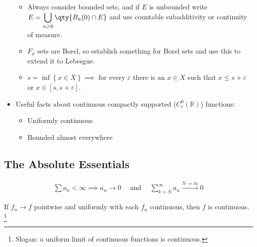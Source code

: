 \begin{itemize}
  \begin{itemize}
  \item
    Always consider bounded sets, and if \(E\) is unbounded write
    \(E = \displaystyle\bigcup_{n\geq 0} \qty{ B_{n}(0) \cap E}\) and
    use countable subadditivity or continuity of measure.
  \item
    \(F_\sigma\) sets are Borel, so establish something for Borel sets
    and use this to extend it to Lebesgue.
  \item
    \(s = \inf\left\{{x\in X}\right\} \implies\) for every
    \(\varepsilon\) there is an \(x\in X\) such that
    \(x \leq s + \varepsilon\) or \(x\in [s, s+{\varepsilon}]\).
  \end{itemize}
\item
  Useful facts about continuous compactly supported
  (\(C_c^0({\mathbb{R}})\)) functions:

  \begin{itemize}
  \tightlist
  \item
    Uniformly continuous
  \item
    Bounded almost everywhere
  \end{itemize}
\end{itemize}

\hypertarget{the-absolute-essentials}{%
\subsection{The Absolute Essentials}\label{the-absolute-essentials}}

\begin{proposition}

\begin{align*}\sum a_n < \infty \implies a_n \to 0 {\quad \operatorname{and} \quad} \sum_{k=N}^\infty a_n \overset{N\to\infty}\to 0\end{align*}

\end{proposition}

\begin{theorem}

If \(f_n\to f\) pointwise and uniformly with each \(f_n\) continuous,
then \(f\) is continuous. \footnote{Slogan: a uniform limit of
  continuous functions is continuous.}

\end{theorem}

